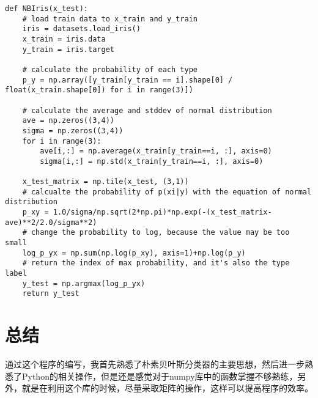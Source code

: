 \documentclass[a4paper, 1pt]{article}
\newcommand{\xiaosihao}{\fontsize{12pt}{\baselineskip}\selectfont}
\begin{document}
\begin{spacing}{1.0}
\begin{lstlisting}
def NBIris(x_test):
    # load train data to x_train and y_train
    iris = datasets.load_iris()
    x_train = iris.data
    y_train = iris.target

    # calculate the probability of each type
    p_y = np.array([y_train[y_train == i].shape[0] / float(x_train.shape[0]) for i in range(3)])

    # calculate the average and stddev of normal distribution
    ave = np.zeros((3,4))
    sigma = np.zeros((3,4))
    for i in range(3):
        ave[i,:] = np.average(x_train[y_train==i, :], axis=0)
        sigma[i,:] = np.std(x_train[y_train==i, :], axis=0)

    x_test_matrix = np.tile(x_test, (3,1))
    # calcualte the probability of p(xi|y) with the equation of normal distribution
    p_xy = 1.0/sigma/np.sqrt(2*np.pi)*np.exp(-(x_test_matrix-ave)**2/2.0/sigma**2)
    # change the probability to log, because the value may be too small
    log_p_yx = np.sum(np.log(p_xy), axis=1)+np.log(p_y)
    # return the index of max probability, and it's also the type label
    y_test = np.argmax(log_p_yx)
    return y_test
\end{lstlisting}


\section{\xiaosihao 总结}
通过这个程序的编写，我首先熟悉了朴素贝叶斯分类器的主要思想，然后进一步熟悉了Python的相关操作，但是还是感觉对于numpy库中的函数掌握不够熟练，另外，就是在利用这个库的时候，尽量采取矩阵的操作，这样可以提高程序的效率。
\end{spacing}
\end{document}
